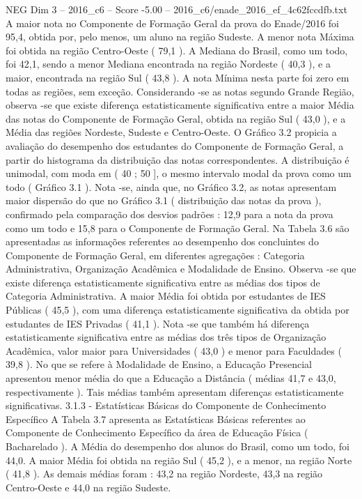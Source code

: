 \begin{textsample}{NEG Dim 3 – 2016\_c6 – Score -5.00 – 2016\_c6/enade\_2016\_ef\_4c62fccdfb.txt}
A maior nota no Componente de Formação Geral da prova do Enade/2016 foi 95,4, obtida por, pelo menos, um aluno na região Sudeste.
A menor nota Máxima foi obtida na região Centro-Oeste ( 79,1 ).
A Mediana do Brasil, como um todo, foi 42,1, sendo a menor Mediana encontrada na região Nordeste ( 40,3 ), e a maior, encontrada na região Sul ( 43,8 ).
A nota Mínima nesta parte foi zero em todas as regiões, sem exceção.
Considerando -se as notas segundo Grande Região, observa -se que existe diferença estatisticamente significativa entre a maior Média das notas do Componente de Formação Geral, obtida na região Sul ( 43,0 ), e a Média das regiões Nordeste, Sudeste e Centro-Oeste.
O Gráfico 3.2 propicia a avaliação do desempenho dos estudantes do Componente de Formação Geral, a partir do histograma da distribuição das notas correspondentes.
A distribuição é unimodal, com moda em ( 40 ; 50 ], o mesmo intervalo modal da prova como um todo ( Gráfico 3.1 ).
Nota -se, ainda que, no Gráfico 3.2, as notas apresentam maior dispersão do que no Gráfico 3.1 ( distribuição das notas da prova ), confirmado pela comparação dos desvios padrões : 12,9 para a nota da prova como um todo e 15,8 para o Componente de Formação Geral.
Na Tabela 3.6 são apresentadas as informações referentes ao desempenho dos concluintes do Componente de Formação Geral, em diferentes agregações : Categoria Administrativa, Organização Acadêmica e Modalidade de Ensino.
Observa -se que existe diferença estatisticamente significativa entre as médias dos tipos de Categoria Administrativa.
A maior Média foi obtida por estudantes de IES Públicas ( 45,5 ), com uma diferença estatisticamente significativa da obtida por estudantes de IES Privadas ( 41,1 ).
Nota -se que também há diferença estatisticamente significativa entre as médias dos três tipos de Organização Acadêmica, valor maior para Universidades ( 43,0 ) e menor para Faculdades ( 39,8 ).
No que se refere à Modalidade de Ensino, a Educação Presencial apresentou menor média do que a Educação a Distância ( médias 41,7 e 43,0, respectivamente ).
Tais médias também apresentam diferenças estatisticamente significativas. 3.1.3 - Estatísticas Básicas do Componente de Conhecimento Específico A Tabela 3.7 apresenta as Estatísticas Básicas referentes ao Componente de Conhecimento Específico da área de Educação Física ( Bacharelado ).
A Média do desempenho dos alunos do Brasil, como um todo, foi 44,0.
A maior Média foi obtida na região Sul ( 45,2 ), e a menor, na região Norte ( 41,8 ).
As demais médias foram : 43,2 na região Nordeste, 43,3 na região Centro-Oeste e 44,0 na região Sudeste.

\end{textsample}
